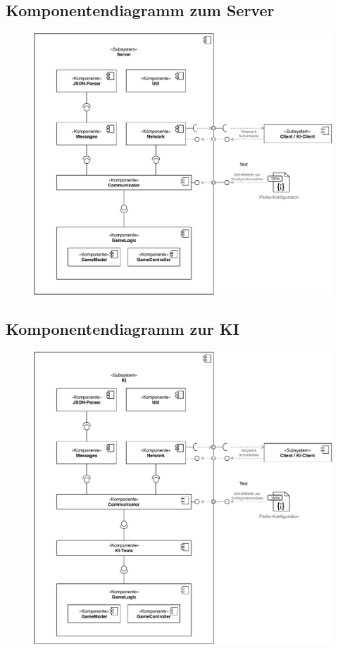 \subsection{Komponentendiagramm zum Server}
\begin{figure}[H]
    \centering
    \includegraphics[scale=0.85]{../Endabnahme/images/ServerDiagramme.pdf}
\end{figure}

\subsection{Komponentendiagramm zur KI}
\begin{figure}[H]
    \centering
    \includegraphics[scale=0.85]{../Endabnahme/images/KiDiagramme.pdf}
\end{figure}

